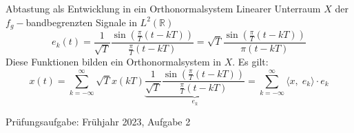 \documentclass[14pt, aspectratio=169, handout]{beamer}
\begin{document}
\begin{frame}{Abtastung als Entwicklung in ein Orthonormalsystem}
    Linearer Unterraum $X$ der $f_g-$bandbegrenzten Signale in $L^2(\mathbb{R})$
    $$e_k(t) = \frac{1}{\sqrt{T}}\frac{\sin\left(\frac{\pi}{T}(t-kT)\right)}{\frac{\pi}{T}(t-kT)} = \sqrt{T} \frac{\sin\left(\frac{\pi}{T}(t-kT)\right)}{\pi(t-kT)}$$
    Diese Funktionen bilden ein Orthonormalsystem in $X$. Es gilt:
    $$x(t) = \sum_{k=-\infty}^\infty \sqrt{T}x(kT)\underbrace{\frac{1}{\sqrt{T}}\frac{\sin\left(\frac{\pi}{T}(t-kT)\right)}{\frac{\pi}{T}(t-kT)}}_{e_k} = \sum_{k = -\infty}^\infty \langle x, \; e_k \rangle \cdot e_k$$
\end{frame}

\begin{frame}{Prüfungsaufgabe: Frühjahr 2023, Aufgabe 2}
    
\end{frame}
\end{document}
